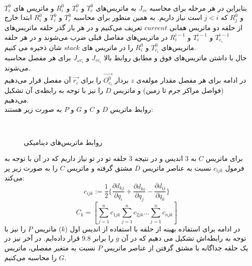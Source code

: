 \documentclass{article}
\begin{document}
\\
بنابراین در هر مرحله برای محاسبه $J_{vc}$ به ماتریس‌های $T_c^0$ و $T_i^0$ و $R_i^0$ و ماتریس های  $T_c^0$ و $R_j^0$ که $j<i$ است نیاز داریم. به همین منظور برای محاسبه  $T_c^0$ و $T_i^0$ و  $R_i^0$ ابتدا خارج از حلقه دو ماتریس همانی $current$ تعریف می‌کنیم و در هر بار گذر حلقه ماتریس‌های  $T_{c_i}^{i-1}$ و $T_{i}^{i-1}$ و $R_{i}^{i-1}$ در ماتریس‌های مفاصل قبلی ضرب می‌شوند و در هر حلقه ماتریس‌های $T_{c_i}^0$ و $R_i^0$ را در ماتریس های $stack$ شان ذخیره می کنیم.
\\
حال با داشتن ماتریس‌های فوق و مطابق روابط بالا $J_{vc_i}$ و $J_{\omega c_i}$ برای هر مفصل محاسبه می‌شوند.
\\
در ادامه برای هر مفصل مقدار مولفه‌ی $z$ بردار $\overrightarrow{O_{c_i}^0}$ را برای $\overrightarrow{r_c}$ آن مفصل قرار می‌دهیم (فواصل مراکز جرم تا زمین) و ماتریس $D$ را نیز با توجه به رابطه‌ی آن تشکیل می‌دهیم.
\\
روابط ماتریس $D$ و $C$ و $G$ و $P$ به صورت زیر هستند:
\begin{figure}[H]%
    \centering
    \qquad
    \qquad
    \\
    \caption{روابط ماتریس‌های دینامیکی\label{fig:formula5}}
\end{figure}
\noindent
برای ماتریس $C$ به 3 اندیس و در نتیجه 3 حلقه تو در تو نیاز داریم که در آن با توجه به فرمول $c_{ijk}$ نسبت به عناصر ماتریس $D$ مشتق گرفته و ماتریس $C$ را به صورت زیر پر 
می‌کند:
\begin{equation}
c_{ijk} := \frac{1}{2}\{\frac{\partial{d_{kj}}}{\partial{q_i}} + \frac{\partial{d_{ki}}}{\partial{q_j}} - \frac{\partial{d_{ij}}}{\partial{q_k}}\}
\end{equation}
\begin{equation}
C_k = [\sum_{j=1}^{n} c_{1jk} \sum_{j=1}^{n} c_{2jk} ... \sum_{j=1}^{n} c_{njk}]
\end{equation}
در ادامه برای استفاده بهینه از حلقه با استفاده از اندیس اول ($k$) ماتریس $P$ را نیز با توجه به رابطه‌اش تشکیل می دهیم که در آن $g$ را برابر $9.8$ قرار داده‌ایم.
در آخر نیز در یک حلقه جداگانه با مشتق گرفتن از عناصر ماتریس $P$ نسبت به متغیر مفصلی، ماتریس $G$ را محاسبه می‌کنیم.
\end{document}
